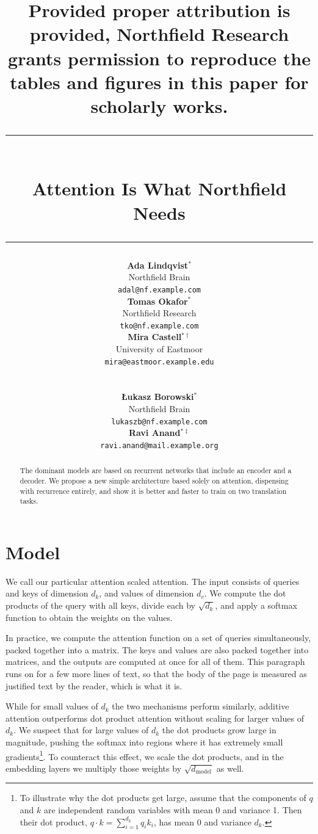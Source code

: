\documentclass[10pt]{article}
\title{{\normalsize\color{red}Provided proper attribution is provided, Northfield Research grants permission to reproduce the tables and figures in this paper for scholarly works.}\\[1em]\rule{\linewidth}{2pt}\\[0.5em]\textbf{Attention Is What Northfield Needs}\\\rule{\linewidth}{0.5pt}}
\author{
\begin{tabular}[t]{c}\textbf{Ada Lindqvist}$^*$\\Northfield Brain\\\texttt{adal@nf.example.com}\end{tabular}\hfill
\begin{tabular}[t]{c}\textbf{Tomas Okafor}$^*$\\Northfield Research\\\texttt{tko@nf.example.com}\end{tabular}\hfill
\begin{tabular}[t]{c}\textbf{Mira Castell}$^{*\dagger}$\\University of Eastmoor\\\texttt{mira@eastmoor.example.edu}\end{tabular}\\[1.5em]
\begin{tabular}[t]{c}\textbf{\L{}ukasz Borowski}$^*$\\Northfield Brain\\\texttt{lukaszb@nf.example.com}\end{tabular}\hfill
\begin{tabular}[t]{c}\textbf{Ravi Anand}$^{*\ddagger}$\\\texttt{ravi.anand@mail.example.org}\end{tabular}
}
\date{}
\renewcommand{\thefootnote}{\fnsymbol{footnote}}
\begin{document}
\maketitle
{}
\renewcommand{\thefootnote}{\arabic{footnote}}\setcounter{footnote}{3}
\begin{abstract}
The dominant models are based on recurrent networks that include an encoder and a decoder. We propose a new simple architecture based solely on attention, dispensing with recurrence entirely, and show it is better and faster to train on two translation tasks.
\end{abstract}
\section{Model}
We call our particular attention scaled attention. The input consists of queries and keys of dimension $d_k$, and values of dimension $d_v$. We compute the dot products of the query with all keys, divide each by $\sqrt{d_k}$, and apply a softmax function to obtain the weights on the values.

In practice, we compute the attention function on a set of queries simultaneously, packed together into a matrix. The keys and values are also packed together into matrices, and the outputs are computed at once for all of them. This paragraph runs on for a few more lines of text, so that the body of the page is measured as justified text by the reader, which is what it is.

While for small values of $d_k$ the two mechanisms perform similarly, additive attention outperforms dot product attention without scaling for larger values of $d_k$. We suspect that for large values of $d_k$ the dot products grow large in magnitude, pushing the softmax into regions where it has extremely small gradients\footnote{To illustrate why the dot products get large, assume that the components of $q$ and $k$ are independent random variables with mean 0 and variance 1. Then their dot product, $q \cdot k = \sum_{i=1}^{d_k} q_i k_i$, has mean 0 and variance $d_k$.}. To counteract this effect, we scale the dot products, and in the embedding layers we multiply those weights by $\sqrt{d_{\text{model}}}$ as well.
\end{document}
